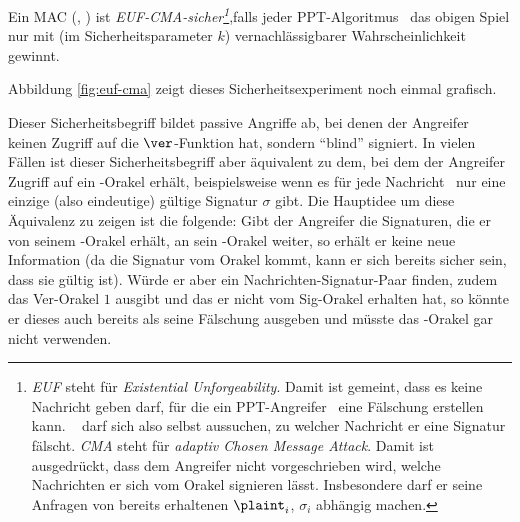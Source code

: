 Ein MAC (\sig, \ver) ist \textit{EUF-CMA-sicher\footnote{\textit{EUF} steht für
    \textit{Existential Unforgeability}. Damit ist gemeint, dass es
    keine Nachricht geben darf, für die ein PPT-Angreifer \A~eine
    Fälschung erstellen kann. \A~ darf sich also selbst aussuchen, zu
    welcher Nachricht er eine Signatur fälscht. \textit{CMA}
    steht für \textit{adaptiv Chosen Message Attack}. Damit ist ausgedrückt,
    dass dem Angreifer nicht vorgeschrieben wird, welche Nachrichten er
    sich vom Orakel signieren lässt. Insbesondere darf er seine Anfragen
    von bereits erhaltenen $\plaint_i$, $\sigma_i$ abhängig machen.}},falls jeder
PPT-Algoritmus \A~das obigen Spiel nur mit (im Sicherheitsparameter $k$)
vernachlässigbarer Wahrscheinlichkeit gewinnt.

Abbildung \ref{fig:euf-cma} zeigt dieses Sicherheitsexperiment noch
einmal grafisch.

Dieser Sicherheitsbegriff bildet passive Angriffe ab, bei denen der
Angreifer keinen Zugriff auf die $\ver$-Funktion hat, sondern "`blind"'
signiert. In vielen Fällen ist dieser Sicherheitsbegriff aber äquivalent
zu dem, bei dem der Angreifer Zugriff auf ein \ver-Orakel erhält,
beispielsweise wenn es für jede Nachricht \plaint~nur eine einzige (also
eindeutige) gültige Signatur $\sigma$ gibt. Die Hauptidee um diese
Äquivalenz zu zeigen ist die folgende: Gibt der Angreifer die
Signaturen, die er von seinem \sig-Orakel erhält, an sein \ver-Orakel
weiter, so erhält er keine neue Information (da die Signatur vom Orakel
kommt, kann er sich bereits sicher sein, dass sie gültig ist). Würde er
aber ein Nachrichten-Signatur-Paar finden, zudem das Ver-Orakel $1$
ausgibt und das er nicht vom Sig-Orakel erhalten hat, so könnte er
dieses auch bereits als seine Fälschung ausgeben und müsste das
\ver-Orakel gar nicht verwenden.

